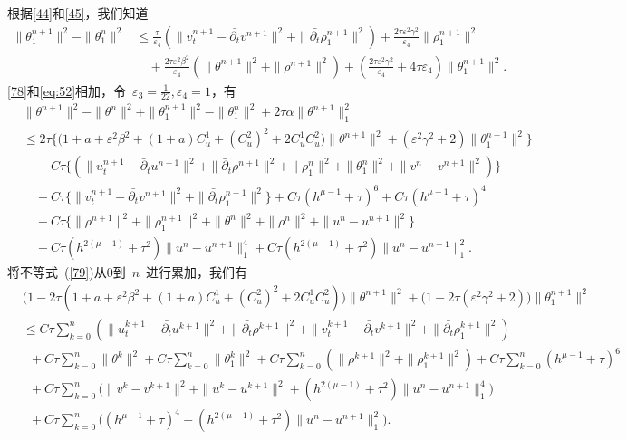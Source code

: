 \documentclass[twoside,UTF8]{nputhesis}
\begin{document}
根据\eqref{44}和\eqref{45}，我们知道
\begin{equation}\label{eq:52}
\begin{split}
\| \theta^{n+1}_1\|^2-\| \theta^n_1\|^2&\leq\frac{\tau}{\varepsilon_4}(\| v_t^{n+1}-\bar{\partial_t}v^{n+1}\|^2+\| \bar{\partial_t}\rho^{n+1}_1\|^2)+\frac{2\tau\varepsilon^2\gamma^2}{\varepsilon_4}\| \rho^{n+1}_1\|^2\\
&\quad+\frac{2\tau\varepsilon^2\beta^2}{\varepsilon_4}(\| \theta^{n+1}\|^2+\| \rho^{n+1}\|^2)
+(\frac{2\tau\varepsilon^2\gamma^2}{\varepsilon_4}+4\tau\varepsilon_4)\| \theta^{n+1}_1\|^2.
\end{split}
\end{equation}
\eqref{78}和\eqref{eq:52}相加，令~$\varepsilon_3=\frac{1}{22},\varepsilon_4=1$，有
\begin{equation}
\begin{split}
&\| \theta^{n+1}\|^2-\| \theta^n\|^2+\| \theta^{n+1}_1\|^2-\| \theta^n_1\|^2+2\tau\alpha\|\theta^{n+1}\|_1^2\\
&\leq 2\tau\Big\{\big(1\!+\!a\!+\!\varepsilon^2\beta^2\!+\!(1+a)C_u^1\!+\!(C_u^2)^2\!+\!2C_u^1C_u^2\big)\|\theta^{n+1}\|^2\!+\!(\varepsilon^2\gamma^2+2)\| \theta^{n+1}_1\|^2\Big\}\\
&\quad+C\tau\Big\{(\| u_t^{n+1}-\bar{\partial}_tu^{n+1}\|^2
+\|\bar{\partial}_t\rho^{n+1}\|^2+\| \rho^n_1\|^2+\|\theta^n_1\|^2+\| v^n-v^{n+1}\|^2)\Big\}\\
&\quad+C\tau\Big\{\| v_t^{n+1}-\bar{\partial_t}v^{n+1}\|^2+\| \bar{\partial_t}\rho^{n+1}_1\|^2\Big\}+C\tau(h^{\mu-1}+\tau)^6+C\tau(h^{\mu-1}+\tau)^4\\
&\quad+C\tau\Big\{\|\rho^{n+1}\|^2+\| \rho_1^{n+1}\|^2+\parallel \theta^n\parallel^2+\| \rho^n\|^2+\| u^n-u^{n+1}\|^2\Big\}\\
&\quad+C\tau(h^{2(\mu-1)}\!+\!\tau^2)\parallel u^n-u^{n+1}\parallel^4_1+C\tau(h^{2(\mu-1)}+\tau^2)\|u^n-u^{n+1}\|_1^2.
\label{79}
\end{split}
\end{equation}
将不等式~(\ref{79})从0到~$n$~进行累加，我们有
\begin{equation*}
\begin{split}
&\big(1\!-\!2\tau(1+a+\varepsilon^2\beta^2\!+\!(1+a)C_u^1+(C_u^2)^2\!+\!2C_u^1C_u^2)\big)\| \theta^{n+1}\|^2\!+\!\big(1\!-\!2\tau(\varepsilon^2\gamma^2+2)\big)\| \theta_1^{n+1}\|^2\\
&\leq C\tau\sum^n_{k=0}(\parallel u^{k+1}_t-\bar{\partial_t}u^{k+1}\parallel^2+\| \bar{\partial_t}\rho^{k+1}\|^2+\| v^{k+1}_t-\bar{\partial_t}v^{k+1}\|^2+\| \bar{\partial_t}\rho^{k+1}_1\|^2)\\
&\,\,\,+C\tau\sum^n_{k=0}\| \theta^k\|^2+C\tau\sum^n_{k=0}\| \theta^k_1\|^2+C\tau\sum^n_{k=0}(\|\rho^{k+1}\|^2+\|\rho^{k+1}_1\|^2)+C\tau\sum^n_{k=0}(h^{\mu-1}+\tau)^6\\
&\,\,\,+C\tau\sum^n_{k=0}\big(\| v^k-v^{k+1}\|^2+\| u^k-u^{k+1}\|^2+(h^{2(\mu-1)}\!+\!\tau^2)\parallel u^n-u^{n+1}\parallel^4_1\big)\\
&\,\,\,+C\tau\sum^n_{k=0}\big((h^{\mu-1}+\tau)^4+(h^{2(\mu-1)}+\tau^2)\|u^n-u^{n+1}\|^2_1\big).
\label{80}
\end{split}
\end{equation*}
\end{document}
